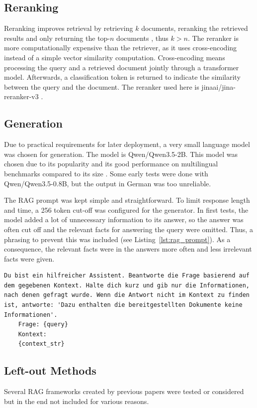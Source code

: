 \documentclass[12pt]{article} %
\begin{document}
\subsection{Reranking}
Reranking improves retrieval by retrieving $k$ documents, reranking the retrieved results and only returning the top-$n$ documents \parencite{nogueira2019passage}, thus $k > n$. The reranker is more computationally expensive than the retriever, as it uses cross-encoding instead of a simple vector similarity computation. Cross-encoding means processing the query and a retrieved document jointly through a transformer model. Afterwards, a classification token is returned to indicate the similarity between the query and the document. The reranker used here is jinaai/jina-reranker-v3 \parencite{wang2025jinarerankerv3lateinteractiondocument}.
\subsection{Generation}
Due to practical requirements for later deployment, a very small language model was chosen for generation. The model is Qwen/Qwen3.5-2B. This model was chosen due to its popularity and its good performance on multilingual benchmarks compared to its size \parencite{qwen3.5_2b}. Some early tests were done with Qwen/Qwen3.5-0.8B, but the output in German was too unreliable.

The RAG prompt was kept simple and straightforward. To limit response length and time, a 256 token cut-off was configured for the generator. In first tests, the model added a lot of unnecessary information to its answer, so the answer was often cut off and the relevant facts for answering the query were omitted. Thus, a phrasing to prevent this was included (see Listing~\ref{lst:rag_prompt}). As a consequence, the relevant facts were in the answers more often and less irrelevant facts were given.
\begin{lstlisting}[breaklines=true, basicstyle=\ttfamily, label=lst:rag_prompt, caption=Prompt for the generative model]
    Du bist ein hilfreicher Assistent. Beantworte die Frage basierend auf dem gegebenen Kontext. Halte dich kurz und gib nur die Informationen, nach denen gefragt wurde. Wenn die Antwort nicht im Kontext zu finden ist, antworte: 'Dazu enthalten die bereitgestellten Dokumente keine Informationen'.
    Frage: {query}
    Kontext:
    {context_str}
\end{lstlisting}
\subsection{Left-out Methods}
Several RAG frameworks created by previous papers were tested or considered but in the end not included for various reasons.
\end{document}
